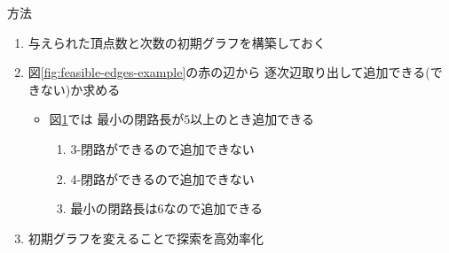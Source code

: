 \documentclass[dvipdfmx]{beamer}
\theoremstyle{definition}
\begin{document}
\begin{frame}{方法}
  \begin{enumerate}
  \item 与えられた頂点数と次数の初期グラフを構築しておく
  \item 図\ref{fig:feasible-edges-example}の赤の辺から
    逐次辺取り出して追加できる(できない)か求める
    \begin{itemize}
    \item 図\ref{fig:feasible-edges-example2}では
      最小の閉路長が$5$以上のとき追加できる
      \begin{enumerate}[a]
      \item 3-閉路ができるので追加できない
      \item 4-閉路ができるので追加できない
      \item 最小の閉路長は6なので追加できる
      \end{enumerate}
    \end{itemize}
    \item 初期グラフを変えることで探索を高効率化
  \end{enumerate}
  \begin{figure}
    \centering
    \begin{minipage}{.4\columnwidth}
      \def\svgwidth{\textwidth}
      
      \label{fig:feasible-edges-example}
    \end{minipage}
    \hspace{1em}
    \begin{minipage}{.4\columnwidth}
      \def\svgwidth{\textwidth}
      
      \label{fig:feasible-edges-example2}
    \end{minipage}
  \end{figure}
\end{frame}
\end{document}
